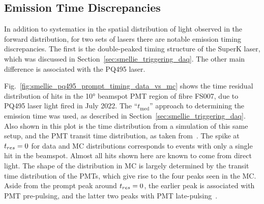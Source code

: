     
    
    
\subsection{Emission Time Discrepancies}
In addition to systematics in the spatial distribution of light observed in the forward distribution, for two sets of lasers there are notable emission timing discrepancies. The first is the double-peaked timing structure of the SuperK laser, which was discussed in Section~\ref{sec:smellie_triggering_daq}. The other main difference is associated with the PQ495 laser.

Fig.~\ref{fig:smellie_pq495_prompt_timing_data_vs_mc} shows the time residual distribution of hits in the \ang{10} beamspot PMT region of fibre FS007, due to PQ495 laser light fired in July 2022. The ``$t_{\mathrm{med}}$'' approach to determining the emission time was used, as described in Section~\ref{sec:smellie_triggering_daq}. Also shown in this plot is the time distribution from a simulation of this same setup, and the PMT transit time distribution, as taken from~\cite{kroupovaPMTTransitTime2018}. The spike at $t_{res}{} = 0$ for data and MC distributions corresponds to events with only a single hit in the beamspot. Almost all hits shown here are known to come from direct light. The shape of the distribution in MC is largely determined by the transit time distribution of the PMTs, which give rise to the four peaks seen in the MC. Aside from the prompt peak around $t_{res}{} = 0$, the earlier peak is associated with PMT pre-pulsing, and the latter two peaks with PMT late-pulsing~\cite{andersonDevelopmentCharacterisationDeployment2021}. %

